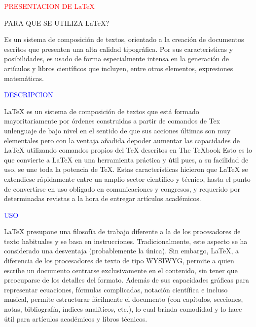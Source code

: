 \documentclass{article}
\begin{document}
\huge \textcolor{red}{PRESENTACION DE \LaTeX }

\vspace{0.5cm}

\Large PARA QUE SE UTILIZA \LaTeX?

\vspace{0.3cm}

Es un sistema de composición de textos, orientado a la creación de documentos escritos que presenten una alta calidad tipográfica. Por sus características y posibilidades, es usado de forma especialmente intensa en la generación de artículos y libros científicos que incluyen, entre otros elementos, expresiones matemáticas.

\vspace{0.5cm}

\Large \textcolor{blue}{DESCRIPCION}

LaTeX es un sistema de composición de textos que está formado mayoritariamente por órdenes construidas a partir de comandos de Tex unlenguaje de bajo nivel en el sentido de que sus acciones últimas son muy elementales pero con la ventaja añadida depoder aumentar las capacidades de LaTeX utilizando comandos propios del TeX descritos en The TeXbook Esto es lo que convierte a LaTeX en una herramienta práctica y útil pues, a su facilidad de uso, se une toda la potencia de TeX. Estas características hicieron que LaTeX se extendiese rápidamente entre un amplio sector científico y técnico, hasta el punto de convertirse en uso obligado en comunicaciones y congresos, y requerido por determinadas revistas a la hora de entregar artículos académicos.

\vspace{0.5cm}

\Large \textcolor{blue}{USO}

LaTeX presupone una filosofía de trabajo diferente a la de los procesadores de texto habituales 
y se basa en instrucciones. Tradicionalmente, este aspecto se ha considerado una desventaja (probablemente la única). Sin embargo, LaTeX, a diferencia de los procesadores de texto de tipo WYSIWYG, permite a quien escribe un documento centrarse exclusivamente en el contenido, sin tener que preocuparse de los detalles del formato. Además de sus capacidades gráficas para representar ecuaciones, fórmulas complicadas, notación científica e incluso musical, permite estructurar fácilmente el documento (con capítulos, secciones, notas, bibliografía, índices analíticos, etc.), lo cual brinda comodidad y lo hace útil para artículos académicos y libros técnicos.
\end{document}
